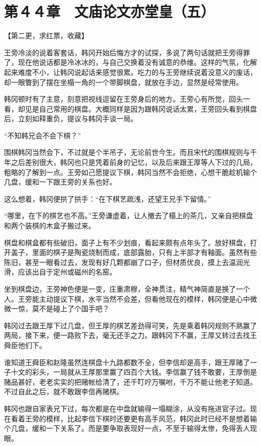 \section{第４４章　文庙论文亦堂皇（五）}

【第二更，求红票，收藏】

王旁冷淡的说着客套话，韩冈开始后悔方才的试探，多说了两句话就把王旁得罪了，现在他说话都是冷冰冰的，与自己交换着没有诚意的恭维。这样的气氛，化解起来难度不小，让韩冈说起话来感觉很累。吃力的与王旁继续说着没意义的废话，却一眼瞥到了摆在坐榻一角的一个带脚棋盘，就放在手边，显然是经常使用。

韩冈顿时有了主意，刻意把视线逗留在王旁身后的地方。王旁心有所觉，回头一看，却见是自己常用的棋盘。大概同样是因为跟韩冈说话太累，王旁回头看到棋盘后，立刻如释重负，提议与韩冈手谈一局。

“不知韩兄会不会下棋？”

围棋韩冈当然会下，不过就是个半吊子，无论前世今生。而且宋代的围棋规则与千年之后差别很大，韩冈也只是凭着前身的记忆，以及后来跟王厚等人下过的几局，粗略的了解到一点。王旁如己愿提议下棋，韩冈当然不会拒绝，心想干脆趁机输个几盘，缓和一下跟王旁的关系也好。

这么想着，韩冈便拱了拱手：“在下棋艺疏浅，还望王兄手下留情。”

“哪里，在下的棋艺也不高。”王旁谦虚着，让人撤去了榻上的茶几，又亲自把棋盘和两个装棋的木盒子搬过来。

棋盘和棋盒都有些破旧，面子上有不少划痕，看起来颇有点年头了。放好棋盘，打开盖子，里面的棋子是陶瓷烧制而成，底部露胎，只有上半部才有釉面。虽然有些陈旧，甚至一眼看过去，发现有好几颗都崩了口子，但材质优良，摸上去温润光滑，应该出自于定州或磁州的名窑。

坐到棋盘边，王旁神色便是一变，庄重肃穆，全神贯注，精气神简直是换了一个人。王旁能主动提议下棋，水平当然不会差，但看他现在的模样，韩冈便是心中微微一惊，莫不是碰上了个国手吧？

韩冈过去跟王厚下过几盘，但王厚的棋艺差劲得可笑，先是乘着韩冈规则不熟赢了两局，接下来，便一路败下去，毫无还手之力。跟韩冈下不赢，王厚又转过去找王舜臣他们下。

谁知道王舜臣和赵隆虽然连棋盘十九路都数不全，但李信却是高手，跟王厚赌了一子十文的彩头，一局就从王厚那里赢了四百个大钱。李信赢了钱不敢要，王厚倒是赌品甚好，老老实实的把赌帐给清了，还千叮咛万嘱咐，千万不能让他老子知道。不过自此之后，就不敢跟李信再赌棋。

韩冈也跟自家表兄下过，每次都是在中盘就输得一塌糊涂，从没有拖进官子过。现在看着王旁的模样，比起李信下棋时还要更有高手风范，韩冈此时已经不是想着输个几盘，缓和一下关系了。而是要争取表现好一点，不至于输得太惨，免得丢人现眼。

